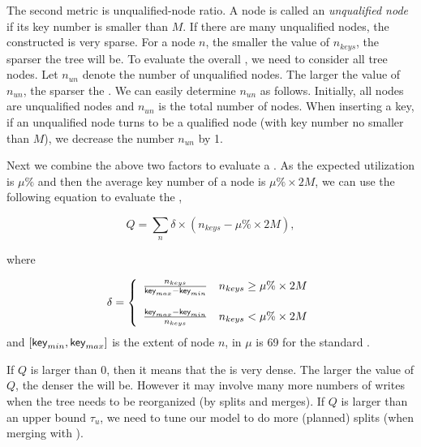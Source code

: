 

The second metric is unqualified-node ratio. A node is called an \emph{unqualified node} if its key number is smaller than $M$. If there are many unqualified nodes, the constructed \bptree is very sparse. For a node $n$, the
smaller the value of $n_{keys}$, the sparser the tree will be.
To evaluate the overall \bptree, we need to consider all tree nodes. Let $n_{un}$ denote the number of unqualified nodes.
The larger the value of $n_{un}$,
the sparser the \bptree. We can easily determine $n_{un}$
as follows. Initially, all nodes are unqualified nodes and $n_{un}$ is the total number of nodes. When inserting a key, if an unqualified node turns to be a qualified node (with key number no smaller than $M$), we decrease the number $n_{un}$ by 1.

Next we combine the above two factors to evaluate a \bptree. As the expected utilization is $\mu\%$ and then the average key number of a node is $\mu\% \times 2M$, we can use the following equation to evaluate the \bptree,

\begin{equation}Q=\sum_n \delta \times (n_{keys}- \mu\% \times 2M),\end{equation}

\noindent where

\begin{equation}
  \delta = \left\{
   \begin{array}{ll}
   \frac{n_{keys}}{\textsf{key}_{max}-\textsf{key}_{min}}  & n_{keys}\geq \mu\% \times 2M \\
   \\
   \frac{\textsf{key}_{max}-\textsf{key}_{min}}{n_{keys}} &  n_{keys}< \mu\% \times 2M \\
   \end{array}
  \right.
\end{equation}
\noindent and $[\textsf{key}_{min},\textsf{key}_{max}]$ is the extent of node $n$, in \cite{DBLP:journals/csur/Comer79} $\mu$ is 69 for the standard \bplustree .

\mbox{}

If $Q$ is larger than 0, then it means that the
\bptree is very dense. The larger the value of $Q$, the denser the \bptree
will be. However it may involve many more numbers of writes when the
tree needs to be reorganized (by splits and merges).
If $Q$ is larger than an upper bound $\tau_u$, we need to tune our model
to do more (planned) splits (when merging \bplustree with \bptree).


